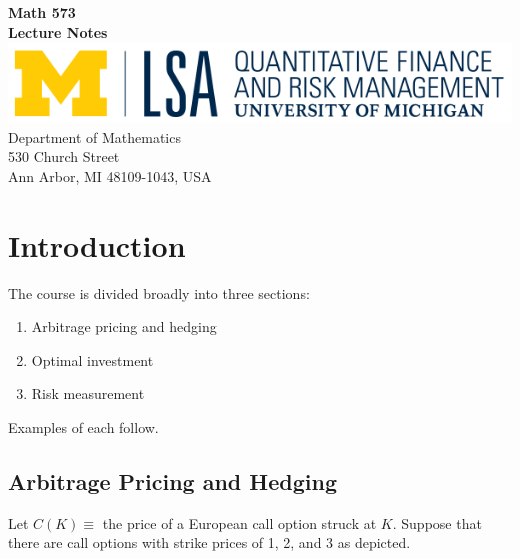 \documentclass{report}
\numberwithin{problem}{chapter} %
\begin{document}
\begin{titlepage}
\begin{center}
 {\huge\bfseries Math 573\\ Lecture Notes\\}
 \vspace{1.5cm}
 \vspace{10cm}
\includegraphics{QFRM_rgb}\\[5pt]
{Department of Mathematics}\\[5pt]
{530 Church Street}\\[5pt]
{Ann Arbor, MI 48109-1043,
 USA}\\
 \vfill

\end{center}
\end{titlepage}

\chapter{Introduction}

The course is divided broadly into three sections:
\begin{enumerate}  
\item Arbitrage pricing and hedging 
\item Optimal investment
\item Risk measurement
\end{enumerate}
Examples of each follow.

\section{Arbitrage Pricing and Hedging}
Let $C(K) \equiv$ the price of a European call option struck at $K$. Suppose that there are call options with strike prices of 1, 2, and 3 as depicted. 
\end{document}
